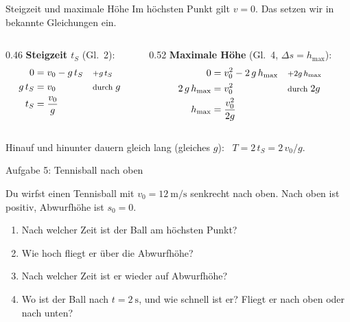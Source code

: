 \documentclass[14pt,aspectratio=169]{beamer}
\begin{document}
\begin{frame}{Steigzeit und maximale Höhe}
  \small
  Im höchsten Punkt gilt $v=0$. Das setzen wir in bekannte Gleichungen ein.
  \begin{columns}[T]
    \begin{column}{0.46\textwidth}
      \textbf{Steigzeit $t_S$} (Gl.~2):
      \begin{align*}
        0 &= v_0-g\,t_S && \text{\footnotesize $+g\,t_S$}\\
        g\,t_S &= v_0 && \text{\footnotesize durch } g\\
        t_S &= \frac{v_0}{g}
      \end{align*}
    \end{column}
    \begin{column}{0.52\textwidth}
      \textbf{Maximale Höhe} (Gl.~4, $\Delta s=h_{\max}$):
      \begin{align*}
        0 &= v_0^2-2\,g\,h_{\max} && \text{\footnotesize $+2g\,h_{\max}$}\\
        2\,g\,h_{\max} &= v_0^2 && \text{\footnotesize durch } 2g\\
        h_{\max} &= \frac{v_0^2}{2g}
      \end{align*}
    \end{column}
  \end{columns}
  \begin{merkbox}
    Hinauf und hinunter dauern gleich lang (gleiches $g$): \
    $T=2\,t_S=2\,v_0/g$.
  \end{merkbox}
\end{frame}

\begin{frame}{Aufgabe 5: Tennisball nach oben}
  \begin{aufgabebox}[Aufgabe 5]
    \small
    Du wirfst einen Tennisball mit $v_0=\SI{12}{\meter\per\second}$
    senkrecht nach oben. Nach oben ist positiv, Abwurfhöhe ist $s_0=0$.
    \begin{enumerate}
      \item[a)] Nach welcher Zeit ist der Ball am höchsten Punkt?
      \item[b)] Wie hoch fliegt er über die Abwurfhöhe?
      \item[c)] Nach welcher Zeit ist er wieder auf Abwurfhöhe?
      \item[d)] Wo ist der Ball nach $t=\SI{2}{\second}$, und wie schnell
        ist er? Fliegt er nach oben oder nach unten?
    \end{enumerate}
  \end{aufgabebox}
\end{frame}
\end{document}
